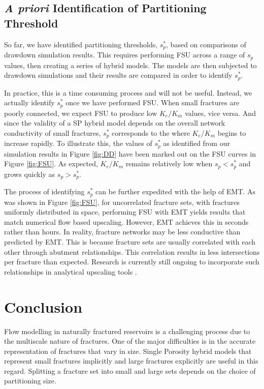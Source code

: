 \documentclass[a4paper]{article}
\begin{document}
\subsection{\textit{A priori} Identification of Partitioning Threshold}
So far, we have identified partitioning thresholds, $s_p^*$, based on comparisons of drawdown simulation results. This requires performing FSU across a range of $s_p$ values, then creating a series of hybrid models. The models are then subjected to drawdown simulations and their results are compared in order to identify $s_p^*$.

In practice, this is a time consuming process and will not be useful. Instead, we actually identify $s_p^*$ once we have performed FSU. When small fractures are poorly connected, we expect FSU to produce low $K_e/K_m$ values, vice versa. And since the validity of a SP hybrid model depends on the overall network conductivity of small fractures, $s_p^*$ corresponds to the where $K_e/K_m$ begins to increase rapidly. To illustrate this, the values of $s_p^*$ as identified from our simulation results in Figure \ref{fig:DD} have been marked out on the FSU curves in Figure \ref{fig:FSU}. As expected, $K_e/K_m$ remains relatively low when $s_p<s_p^*$ and grows quickly as $s_p>s_p^*$. 

The process of identifying $s_p^*$ can be further expedited with the help of EMT. As was shown in Figure \ref{fig:FSU}, for uncorrelated fracture sets, with fractures uniformly distributed in space, performing FSU with EMT yields results that match numerical flow based upscaling. However, EMT achieves this in seconds rather than hours. In reality, fracture networks may be less conductive than predicted by EMT. This is because fracture sets are usually correlated with each other through abutment relationships. This correlation results in less intersections per fracture than expected. Research is currently still ongoing to incorporate such relationships in analytical upscaling tools \citep{Hardebol2015, Makel2007, Saevik2017}. 

\section{Conclusion}
Flow modelling in naturally fractured reservoirs is a challenging process due to the multiscale nature of fractures. One of the major difficulties is in the accurate representation of fractures that vary in size. Single Porosity hybrid models that represent small fractures implicitly and large fractures explicitly are useful in this regard. Splitting a fracture set into small and large sets depends on the choice of partitioning size.
\end{document}
